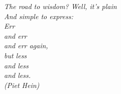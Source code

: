 \begin{epigrafe}
  \vspace*{\fill}
  \begin{flushright}
    \textit{
      The road to wisdom? Well, it's plain\\
      And simple to express:\\
      Err\\
      and err\\
      and err again,\\
      but less\\
      and less\\
      and less.\\
      (Piet Hein)
    }
  \end{flushright}
\end{epigrafe}
